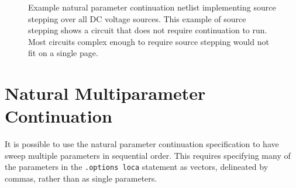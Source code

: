 \begin{figure}[htbp]
\begin{centering}
\caption[Example natural parameter continuation netlist]{Example natural parameter continuation netlist implementing source stepping over all DC voltage sources. This example of source stepping shows a circuit that does not require continuation to run. Most circuits complex enough to require source stepping would not fit on a single page.\label{Continuation_Netlist_sourceStepping2}}
\end{centering}
\end{figure}

\newpage 
\section{Natural Multiparameter Continuation} 
\label{continuation_natural_multiparam}

It is possible to use the natural parameter continuation specification to  
have \Xyce{} sweep multiple parameters in sequential order.  This 
requires specifying many of the parameters in the \texttt{.options loca} statement as vectors, delineated by commas, rather than as single parameters.  


